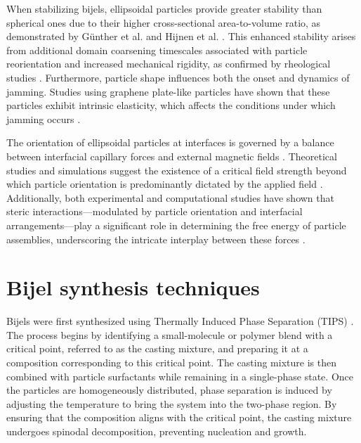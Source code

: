 When stabilizing bijels, ellipsoidal particles provide greater stability than spherical ones due to their higher cross-sectional area-to-volume ratio, as demonstrated by 
Günther et al. and Hijnen et al. \cite{gunther_timescales_2014, hijnen_bijels_2015}. This enhanced stability arises from additional domain coarsening timescales associated 
with particle reorientation and increased mechanical rigidity, as confirmed by rheological studies \cite{gunther_timescales_2014, daware_emulsions_2015, witt_bijel_2013}. 
Furthermore, particle shape influences both the onset and dynamics of jamming. Studies using graphene plate-like particles have shown that these particles exhibit intrinsic 
elasticity, which affects the conditions under which jamming occurs \cite{imperiali_simple_2014, sun_assembly_2013}.

The orientation of ellipsoidal particles at interfaces is governed by a balance between interfacial capillary forces and external magnetic fields 
\cite{bresme_orientational_2007, davies_assembling_2014}. Theoretical studies and simulations suggest the existence of a critical field strength beyond which particle 
orientation is predominantly dictated by the applied field \cite{bresme_orientational_2007, davies_assembling_2014}. Additionally, both experimental and computational 
studies have shown that steric interactions—modulated by particle orientation and interfacial arrangements—play a significant role in determining the free energy of particle 
assemblies, underscoring the intricate interplay between these forces \cite{morgan_understanding_2013, newton_influence_2014, newton_capillary_2018}.


\section{Bijel synthesis techniques}

Bijels were first synthesized using Thermally Induced Phase Separation (TIPS) \cite{herzig_bicontinuous_2007, lee_bicontinuous_2010, bai_dynamics_2015}. 
The process begins by identifying a small-molecule or polymer blend with a critical point, referred to as the casting mixture, and preparing it at a composition 
corresponding to this critical point. The casting mixture is then combined with particle surfactants while remaining in a single-phase state. Once the particles 
are homogeneously distributed, phase separation is induced by adjusting the temperature to bring the system into the two-phase region. By ensuring that the 
composition aligns with the critical point, the casting mixture undergoes spinodal decomposition, preventing nucleation and growth.  

